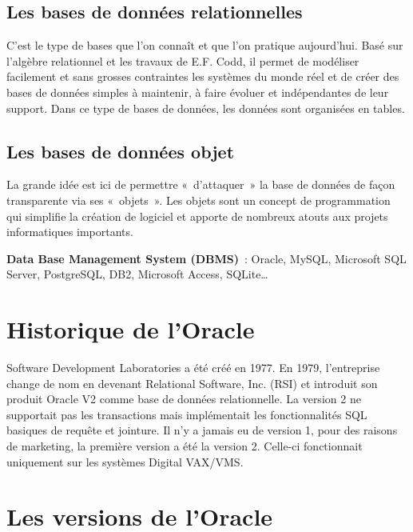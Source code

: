 \documentclass[12pt,a4paper]{report}
\begin{document}
\subsection{Les bases de données relationnelles}

C'est le type de bases que l'on connaît et que l'on pratique aujourd'hui. Basé
sur l'algèbre relationnel et les travaux de E.F. Codd, il permet de modéliser
facilement et sans grosses contraintes les systèmes du monde réel et de créer
des bases de données simples à maintenir, à faire évoluer et indépendantes de
leur support. Dans ce type de bases de données, les données sont organisées
en tables.

\subsection{Les bases de données objet}

La grande idée est ici de permettre «~d'attaquer~» la base de données de façon
transparente via ses «~objets~». Les objets sont un concept de programmation qui
simplifie la création de logiciel et apporte de nombreux atouts aux projets
informatiques importants.

\medskip
\noindent\textbf{Data Base Management System (DBMS)}~: Oracle, MySQL, Microsoft
SQL Server, PostgreSQL, DB2, Microsoft Access, SQLite\ldots

\section{Historique de l'Oracle}

Software Development Laboratories a été créé en 1977. En 1979, l'entreprise
change de nom en devenant Relational Software, Inc. (RSI) et introduit son
produit Oracle V2 comme base de données relationnelle. La version 2 ne
supportait pas les transactions mais implémentait les fonctionnalités SQL
basiques de requête et jointure. Il n'y a jamais eu de version 1, pour des
raisons de marketing, la première version a été la version 2. Celle-ci
fonctionnait uniquement sur les systèmes Digital VAX/VMS.

\section{Les versions de l'Oracle}
\end{document}
